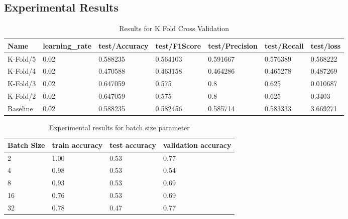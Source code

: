 \documentclass{article}
\begin{document}
\subsection{Experimental Results}

\begin{table}[h!]
\caption{Results for K Fold Cross Validation}
\label{table:kfold}
\begin{tabular}{@{}lllllll@{}}
\toprule
Name     & learning\_rate & test/Accuracy & test/F1Score & test/Precision & test/Recall & test/loss \\ \midrule
K-Fold/5 & 0.02           & 0.588235      & 0.564103     & 0.591667       & 0.576389    & 0.568222  \\
K-Fold/4 & 0.02           & 0.470588      & 0.463158     & 0.464286       & 0.465278    & 0.487269  \\
K-Fold/3 & 0.02           & 0.647059      & 0.575        & 0.8            & 0.625       & 0.010687  \\
K-Fold/2 & 0.02           & 0.647059      & 0.575        & 0.8            & 0.625       & 0.3403    \\
Baseline & 0.02           & 0.588235      & 0.582456     & 0.585714       & 0.583333    & 3.669271  \\ \bottomrule
\end{tabular}
\end{table}

\begin{table}[h]
    \centering    
    \caption{Experimental results for batch size parameter}
    \label{table:batch}
    \begin{tabular}{llll}
        \toprule
        \centering
        {Batch Size} & train accuracy & test accuracy & validation accuracy \\
        \midrule
         2 & 1.00  & 0.53 & 0.77 \\
         4 & 0.98 & 0.53 & 0.54  \\
         8 & 0.93 & 0.53 & 0.69 \\
         16 & 0.76 & 0.53 & 0.69 \\
         32 & 0.78 & 0.47 & 0.77 \\
        \bottomrule
    \end{tabular}
\end{table}
\end{document}
